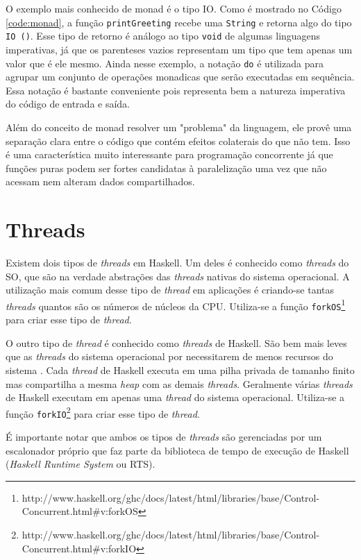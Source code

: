 O exemplo mais conhecido de monad é o tipo IO. Como é mostrado no Código \ref{code:monad}, a função \verb|printGreeting| recebe uma \verb|String| e retorna algo do tipo \verb|IO ()|. Esse tipo de retorno é análogo ao tipo \verb|void| de algumas linguagens imperativas, já que os parenteses vazios representam um tipo que tem apenas um valor que é ele mesmo. Ainda nesse exemplo, a notação \verb|do| é utilizada para agrupar um conjunto de operações monadicas que serão executadas em sequência. Essa notação é bastante conveniente pois  representa bem a natureza imperativa do código de entrada e saída.

Além do conceito de monad resolver um "problema" da linguagem, ele provê uma separação clara entre o código que contém efeitos colaterais do que não tem. Isso é uma característica muito interessante para programação concorrente já que funções puras podem ser fortes candidatas à paralelização uma vez que não acessam nem alteram dados compartilhados.


\section{Threads}

Existem dois tipos de \emph{threads} em Haskell. Um deles é conhecido como \emph{threads} do SO, que são na verdade abstrações das \emph{threads} nativas do sistema operacional. A utilização mais comum desse tipo de \emph{thread} em aplicações é criando-se tantas \emph{threads} quantos são os números de núcleos da CPU. Utiliza-se a função \verb|forkOS|\footnote{http://www.haskell.org/ghc/docs/latest/html/libraries/base/Control-Concurrent.html\#v:forkOS} para criar esse tipo de \emph{thread}.

O outro tipo de \emph{thread} é conhecido como \emph{threads} de Haskell. São bem mais leves que as \emph{threads} do sistema operacional por necessitarem de menos recursos do sistema \cite{marlow2009runtime}. Cada \emph{thread} de Haskell executa em uma pilha privada de tamanho finito mas compartilha a mesma \emph{heap} com as demais \emph{threads}. Geralmente várias \emph{threads} de Haskell executam em apenas uma \emph{thread} do sistema operacional. Utiliza-se a função \verb|forkIO|\footnote{http://www.haskell.org/ghc/docs/latest/html/libraries/base/Control-Concurrent.html\#v:forkIO} para criar esse tipo de \emph{thread}.

É importante notar que ambos os tipos de \emph{threads} são gerenciadas por um escalonador próprio que faz parte da biblioteca de tempo de execução de Haskell (\emph{Haskell Runtime System} ou RTS). 

